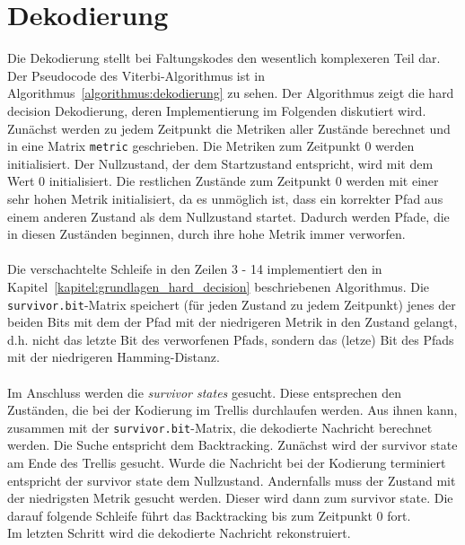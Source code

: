 \section{Dekodierung}
\label{kapitel:implementierung_dekodierung}
Die Dekodierung stellt bei Faltungskodes den wesentlich komplexeren Teil dar. Der Pseudocode des Viterbi-Algorithmus ist in Algorithmus~\ref{algorithmus:dekodierung} zu sehen. Der Algorithmus zeigt die hard decision Dekodierung, deren Implementierung im Folgenden diskutiert wird. Zunächst werden zu jedem Zeitpunkt die Metriken aller Zustände berechnet und in eine Matrix \texttt{metric} geschrieben. Die Metriken zum Zeitpunkt 0 werden initialisiert. Der Nullzustand, der dem Startzustand entspricht, wird mit dem Wert 0 initialisiert. Die restlichen Zustände zum Zeitpunkt 0 werden mit einer sehr hohen Metrik initialisiert, da es unmöglich ist, dass ein korrekter Pfad aus einem anderen Zustand als dem Nullzustand startet. Dadurch werden Pfade, die in diesen Zuständen beginnen, durch ihre hohe Metrik immer verworfen. 
\\
\\
Die verschachtelte Schleife in den Zeilen 3 - 14 implementiert den in Kapitel~\ref{kapitel:grundlagen_hard_decision} beschriebenen Algorithmus. Die \texttt{survivor.bit}-Matrix speichert (für jeden Zustand zu jedem Zeitpunkt) jenes der beiden Bits mit dem der Pfad mit der niedrigeren Metrik in den Zustand gelangt, d.h. nicht das letzte Bit des verworfenen Pfads, sondern das (letze) Bit des Pfads mit der niedrigeren Hamming-Distanz.
\\
\\
Im Anschluss werden die \emph{survivor states} gesucht. Diese entsprechen den Zuständen, die bei der Kodierung im Trellis durchlaufen werden. Aus ihnen kann, zusammen mit der \texttt{survivor.bit}-Matrix, die dekodierte Nachricht berechnet werden. Die Suche entspricht dem Backtracking. Zunächst wird der survivor state am Ende des Trellis gesucht. Wurde die Nachricht bei der Kodierung terminiert entspricht der survivor state dem Nullzustand. Andernfalls muss der Zustand mit der niedrigsten Metrik gesucht werden. Dieser wird dann zum survivor state. Die darauf folgende Schleife führt das Backtracking bis zum Zeitpunkt 0 fort.
\\
Im letzten Schritt wird die dekodierte Nachricht rekonstruiert.

